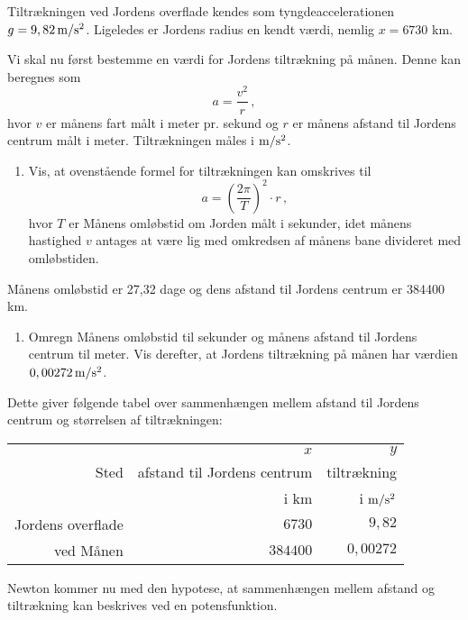 \documentclass[12pt,oneside,a4paper]{article}
\newcommand{\be}{\begin{equation}}
\newcommand{\ee}{\end{equation}}
\theoremstyle{plain}
\begin{document}
Tiltrækningen ved Jordens overflade kendes som tyngdeaccelerationen $g=9,82\,
{\rm m}/{\rm s}^2$.  Ligeledes er Jordens radius en kendt værdi, nemlig
$x=6730$ km.

Vi skal nu først bestemme en værdi for Jordens tiltrækning på månen.
Denne kan beregnes som
\be
a = \frac{v^2}{r}\,,
\label{acc}
\ee
hvor $v$ er månens fart målt i meter pr. sekund og $r$ er månens afstand til
Jordens centrum målt i meter.  Tiltrækningen måles i ${\rm m}/{\rm s}^2$.

\begin{enumerate}[label=(\alph*)]
    \item Vis, at ovenstående formel for tiltrækningen kan omskrives til 
        $$
        a = \left(\frac{2\pi}{T}\right)^2 \cdot r\,,
        $$
        hvor $T$ er Månens omløbstid om Jorden målt i sekunder, idet månens
        hastighed $v$ antages at være lig med omkredsen af månens bane
        divideret med omløbstiden. \label{a}
\end{enumerate}

Månens omløbstid er 27,32 dage og dens afstand til Jordens centrum er 384400 km.

\begin{enumerate}[label=(\alph*) ,resume]
    \item Omregn Månens omløbstid til sekunder og månens afstand til Jordens
        centrum til meter. Vis derefter, at Jordens tiltrækning på månen har
        værdien $0,00272\, {\rm m}/{\rm s}^2$.
\end{enumerate}

Dette giver følgende tabel over sammenhængen mellem afstand til Jordens centrum
og størrelsen af tiltrækningen:

\begin{center}
\begin{tabular}{|r|r|r|}
    \hline
          & $x$                         & $y$ \\
    Sted  & afstand til Jordens centrum & tiltrækning   \\
          & i km                        & i ${\rm m}/{\rm s}^2$  \\
    \hline 
    Jordens overflade & $6730$  & $9,82$ \\
    \hline
    ved Månen         & $384400$ & $0,00272$ \\
    \hline 
\end{tabular}
\end{center}

Newton kommer nu med den hypotese, at sammenhængen mellem afstand og
tiltrækning kan beskrives ved en potensfunktion.
\end{document}

